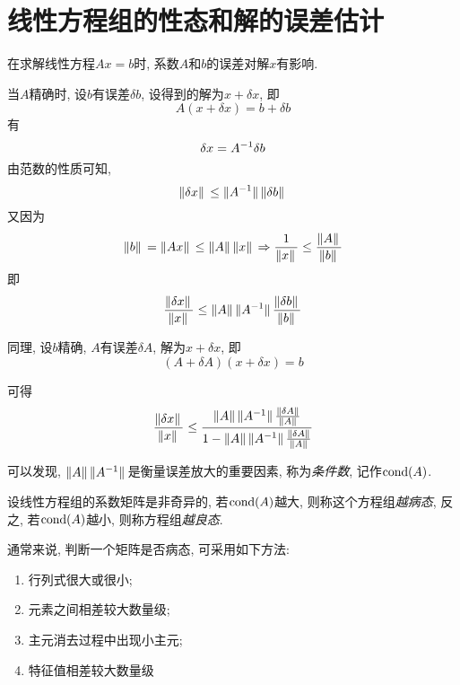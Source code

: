 \section{线性方程组的性态和解的误差估计}

在求解线性方程$Ax=b$时, 系数$A$和$b$的误差对解$x$有影响. 

当$A$精确时, 设$b$有误差$\delta b$, 设得到的解为$x+\delta x$, 即
\begin{equation*}
    A(x+\delta x)=b+\delta b
\end{equation*}
有
\begin{equation*}
    \delta x=A^{-1}\delta b
\end{equation*}
由范数的性质可知,
\begin{equation*}
    \norm*{\delta x}\le\norm*{A^{-1}}\norm*{\delta b}
\end{equation*}
又因为
\begin{equation*}
    \norm*{b}=\norm*{Ax}\le\norm*{A}\norm*{x}\Rightarrow\frac{1}{\norm*{x}}\le\frac{\norm*{A}}{\norm*{b}}
\end{equation*}
即
\begin{equation*}
    \frac{\norm*{\delta x}}{\norm*{x}}\le\norm*{A}\norm*{A^{-1}}\frac{\norm*{\delta b}}{\norm*{b}}
\end{equation*}

同理, 设$b$精确, $A$有误差$\delta A$, 解为$x+\delta x$, 即
\begin{equation*}
    (A+\delta A)(x+\delta x)=b
\end{equation*}

可得
\begin{equation*}
    \frac{\norm*{\delta x}}{\norm*{x}}\le\frac{\norm*{A}\norm*{A^{-1}}\frac{\norm*{\delta A}}{\norm*{A}}}{1-\norm*{A}\norm*{A^{-1}}\frac{\norm*{\delta A}}{\norm*{A}}}
\end{equation*}

可以发现, $\norm*{A}\norm*{A^{-1}}$是衡量误差放大的重要因素, 称为\emph{条件数}, 记作$\text{cond}(A)$.

\begin{definition}
    设线性方程组的系数矩阵是非奇异的, 若$\text{cond}(A)$越大, 则称这个方程组\emph{越病态}, 反之, 若$\text{cond}(A)$越小, 则称方程组\emph{越良态}.
\end{definition}

通常来说, 判断一个矩阵是否病态, 可采用如下方法:
\begin{enumerate}
    \item 行列式很大或很小;
    \item 元素之间相差较大数量级;
    \item 主元消去过程中出现小主元;
    \item 特征值相差较大数量级
\end{enumerate}